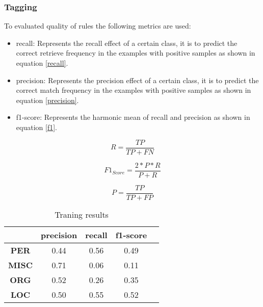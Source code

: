 \documentclass{IEEEtran}
\begin{document}
\subsubsection{Tagging}

To evaluated quality of rules the following metrics are used:
\begin{itemize}
  \item recall: Represents the recall effect of a certain class, it is to predict the correct retrieve frequency in the examples with positive samples as shown in equation \ref{recall}.
  \item precision: Represents the precision effect of a certain class, it is to predict the correct match frequency in the examples with positive samples as shown in equation \ref{precision}.
  \item f1-score: Represents the harmonic mean of recall and precision as shown in equation \ref{f1}.
\end{itemize}

\begin{equation}
  \label{recall}
  R = \frac{TP}{TP + FN}
\end{equation}

\begin{equation}
  \label{f1}
  F1_{Score} = \frac{2*P*R}{P + R}
\end{equation}

\begin{equation}
  \label{precision}
  P = \frac{TP}{TP + FP}
\end{equation}


\begin{table}[ht]
  \centering
  \begin{tabular}{|c|c|c|c|c|}
    \hline
    \textbf{}     & \textbf{precision} & \textbf{recall} & \textbf{f1-score} \\ \hline
    \textbf{PER}  & 0.44               & 0.56            & 0.49              \\
    \textbf{MISC} & 0.71               & 0.06            & 0.11              \\
    \textbf{ORG}  & 0.52               & 0.26            & 0.35              \\
    \textbf{LOC}  & 0.50               & 0.55            & 0.52              \\ \hline
  \end{tabular}
  \caption{Traning results}
  \label{tab:results}
\end{table}
\end{document}

